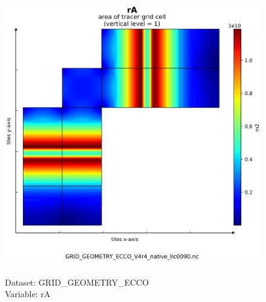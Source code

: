 \begin{figure}[H]
\centering
\includegraphics[scale=0.5]{../images/plots/native_plots_coords/Geometry_Parameters_for_the_Lat-Lon-Cap_90_(llc90)_Native_Model_Grid_(Version_4_Release_4)/rA.png}
\caption{\\Dataset: GRID\_GEOMETRY\_ECCO\\Variable: rA}
\label{tab:table-GRID_GEOMETRY_ECCO_rA-Plot}
\end{figure}
\pagebreak
